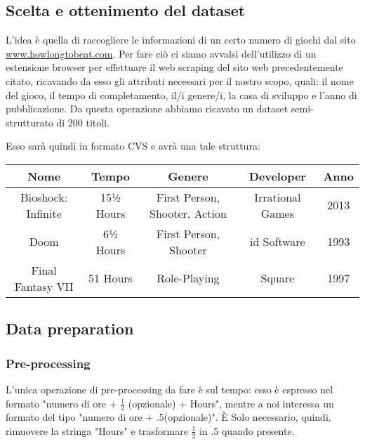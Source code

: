    \subsection{Scelta e ottenimento del dataset}
        L'idea è quella di raccogliere le informazioni di un certo numero di giochi dal sito \url{www.howlongtobeat.com}. Per fare ciò ci siamo avvalsi dell'utilizzo di un estensione browser per effettuare il web scraping del sito web precedentemente citato, ricavando da esso gli attributi necessari per il nostro scopo, quali: il nome del gioco, il tempo di completamento, il/i genere/i, la casa di sviluppo e l'anno di pubblicazione. Da questa operazione abbiamo ricavato un dataset semi-strutturato di 200 titoli.
        
        Esso sarà quindi in formato CVS e avrà una tale struttura:
        \begin{table}[h]
            \begin{tabular}{|c|c|c|c|c|}
            \hline
            \textbf{Nome} & \textbf{Tempo} & \textbf{Genere}               & \textbf{Developer} & \textbf{Anno} \\ \hline
            Bioshock: Infinite & 15½ Hours & First Person, Shooter, Action & Irrational Games & 2013\\ \hline
            Doom               & 6½ Hours       & First Person, Shooter         & id Software & 1993        \\ \hline
            Final Fantasy VII  & 51 Hours       & Role-Playing                  & Square & 1997             \\ \hline
            \end{tabular}
        \end{table}
        
    \subsection{Data preparation}
    
        \subsubsection{Pre-processing}
            L'unica operazione di pre-processing da fare è sul tempo: esso è espresso nel formato "numero di ore + $\frac{1}{2}$ (opzionale) + Hours", mentre a noi interessa un formato del tipo "numero di ore + .5(opzionale)". È Solo necessario, quindi, rimuovere la stringa "Hours" e trasformare $\frac{1}{2}$ in .5 quando presente.
        
